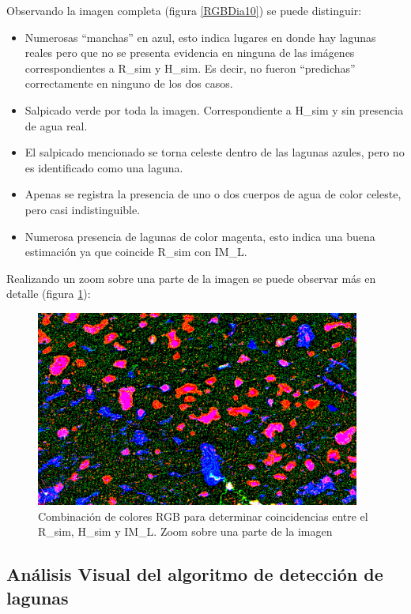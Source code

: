 \documentclass[10pt,a4paper, twoside]{report}
\begin{document}
Observando la imagen completa (figura \ref{RGBDia10}) se puede distinguir:

\begin{itemize}
	\item Numerosas "`manchas"' en azul, esto indica lugares en donde hay lagunas reales pero que no se presenta evidencia en ninguna de las imágenes correspondientes a R\_sim y H\_sim. Es decir, no fueron "`predichas"' correctamente en ninguno de los dos casos.
	\item Salpicado verde por toda la imagen. Correspondiente a H\_sim y sin presencia de agua real. 
	\item El salpicado mencionado se torna celeste dentro de las lagunas azules, pero no es identificado como una laguna.
	\item Apenas se registra la presencia de uno o dos cuerpos de agua de color celeste, pero casi indistinguible.
	\item Numerosa presencia de lagunas de color magenta, esto indica una buena estimación ya que coincide R\_sim con IM\_L.
\end{itemize}

Realizando un zoom sobre una parte de la imagen se puede observar más en detalle (figura \ref{RGBDia10Zoom}):

\begin{figure}[H]
   \centering      
   \includegraphics[width=0.95\textwidth]{imagenes/RGBDia10Zoom.jpg}
 \caption{Combinación de colores RGB para determinar coincidencias entre el R\_sim, H\_sim y IM\_L. Zoom sobre una parte de la imagen}
 \label{RGBDia10Zoom}
\end{figure}

\subsection{Análisis Visual del algoritmo de detección de lagunas}
\end{document}
